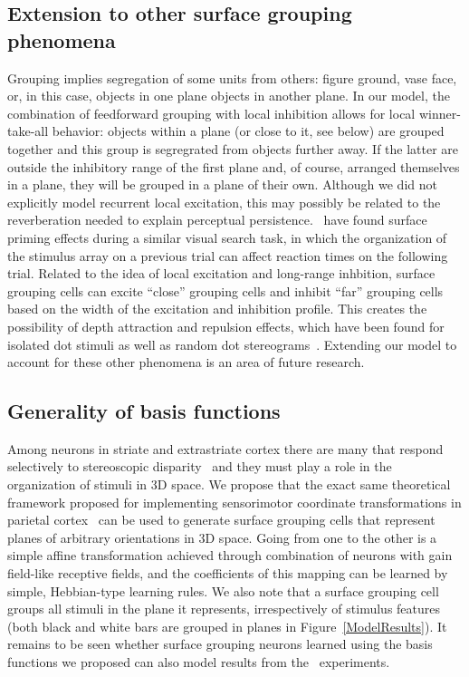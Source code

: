 \subsection{Extension to other surface grouping phenomena}

Grouping implies segregation of some units from others: figure \vs ground, vase \vs face, or, in this case, objects in one plane \vs objects in another plane. In our model, the combination of feedforward grouping with local inhibition allows for local winner-take-all behavior: objects within a plane (or close to it, see below) are grouped together and this group is segregrated from objects further away. If the latter are outside the inhibitory range of the first plane and, of course, arranged themselves in a plane, they will be grouped in a plane of their own. Although we did not explicitly model recurrent local excitation, this may possibly be related to the reverberation needed to explain perceptual persistence.~\citet{McCarley_He01} have found surface priming effects during a similar visual search task, in which the organization of the stimulus array on a previous trial can affect reaction times on the following trial. Related to the idea of local excitation and long-range inhbition, surface grouping cells can excite “close” grouping cells and inhibit “far” grouping cells based on the width of the excitation and inhibition profile. This creates the possibility of depth attraction and repulsion effects, which have been found for isolated dot stimuli as well as random dot stereograms~\citep{Stevenson_etal91}. Extending our model to account for these other phenomena is an area of future research.

\subsection{Generality of basis functions}

Among neurons in striate and extrastriate cortex there are many that respond selectively to stereoscopic disparity~\citep{Poggio_Fischer77,Cumming_DeAngelis01} and they must play a role in the organization of stimuli in 3D space. We propose that the exact same theoretical framework proposed for implementing sensorimotor coordinate transformations in parietal cortex~\citep{Salinas_Abbott95,Pouget_Sejnowski97b} can be used to generate surface grouping cells that represent planes of arbitrary orientations in 3D space. Going from one to the other is a simple affine transformation achieved through combination of neurons with gain field-like receptive fields, and the coefficients of this mapping can be learned by simple, Hebbian-type learning rules. We also note that a surface grouping cell groups all stimuli in the plane it represents, irrespectively of stimulus features (both black and white bars are grouped in planes in Figure~\ref{ModelResults}). It remains to be seen whether surface grouping neurons learned using the basis functions we proposed can also model results from the~\citet{He_Nakayama95} experiments.

